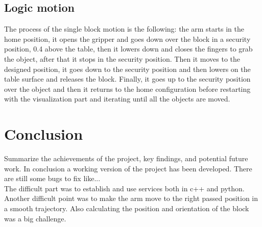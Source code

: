 \documentclass[12pt,a4paper]{article}
\begin{document}
\subsection{Logic motion}\label{subsec:logic}
The process of the single block motion is the following: the arm starts in the home position, it opens the gripper and goes down over the block in a security position, 0.4 above the table, then it lowers down and closes the fingers to grab the object, after that it stops in the security position. Then it moves to the designed position, it goes down to the security position and then lowers on the table surface and releases the block. Finally, it goes up to the security position over the object and then it returns to the home configuration before restarting with the visualization part and iterating until all the objects are moved.

\section{Conclusion}\label{sec:conclusion}
Summarize the achievements of the project, key findings, and potential future work. 
In conclusion a working version of the project has been developed. There are still some bugs to fix like...\\
The difficult part was to establish and use services both in c++ and python. Another difficult point was to make the arm move to the right passed position in a smooth trajectory. Also calculating the position and orientation of the block was a big challenge.
\end{document}
